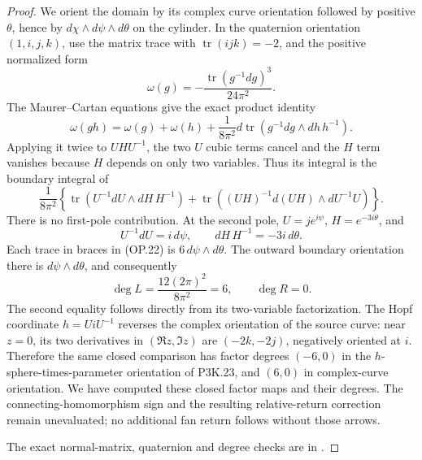 \begin{proof}
We orient the domain by its complex curve orientation followed by
positive \(\theta\), hence by \(d\chi\wedge d\psi\wedge d\theta\)
on the cylinder. In the quaternion orientation \((1,i,j,k)\), use
the matrix trace with \(\operatorname{tr}(ijk)=-2\), and the positive
normalized form
\[
 \omega(g)=-\frac{\operatorname{tr}(g^{-1}dg)^3}{24\pi^2}.
\]
The Maurer--Cartan equations give the exact product identity
\[
 \omega(gh)=\omega(g)+\omega(h)+
 \frac{1}{8\pi^2}d\operatorname{tr}
       (g^{-1}dg\wedge dh\,h^{-1}).                  \tag{OP.21}
\]
Applying it twice to \(UHU^{-1}\), the two \(U\) cubic terms cancel
and the \(H\) term vanishes because \(H\) depends on only two
variables. Thus its integral is the boundary integral of
\[
 \frac{1}{8\pi^2}\left\{
 \operatorname{tr}(U^{-1}dU\wedge dH\,H^{-1})+
 \operatorname{tr}((UH)^{-1}d(UH)\wedge dU^{-1}U)\right\}.
                                                               \tag{OP.22}
\]
There is no first-pole contribution. At the second pole,
\(U=je^{i\psi}\), \(H=e^{-3i\theta}\), and
\[
 U^{-1}dU=i\,d\psi,\qquad dH\,H^{-1}=-3i\,d\theta.
\]
Each trace in braces in (OP.22) is
\(6\,d\psi\wedge d\theta\). The outward boundary orientation there
is \(d\psi\wedge d\theta\), and consequently
\[
 \deg L=\frac{12(2\pi)^2}{8\pi^2}=6,\qquad
 \deg R=0.                                            \tag{OP.23}
\]
The second equality follows directly from its two-variable
factorization. The Hopf coordinate \(h=UiU^{-1}\) reverses the
complex orientation of the source curve: near \(z=0\), its two
derivatives in \((\Re z,\Im z)\) are \((-2k,-2j)\), negatively
oriented at \(i\). Therefore the same closed comparison has
factor degrees \((-6,0)\) in the \(h\)-sphere-times-parameter
orientation of P3K.23, and \((6,0)\) in complex-curve orientation.
We have computed these closed factor maps and their degrees. The
connecting-homomorphism sign and the resulting relative-return
correction remain unevaluated; no additional fan return follows
without those arrows.

The exact normal-matrix, quaternion and degree checks are in
.
\end{proof}
